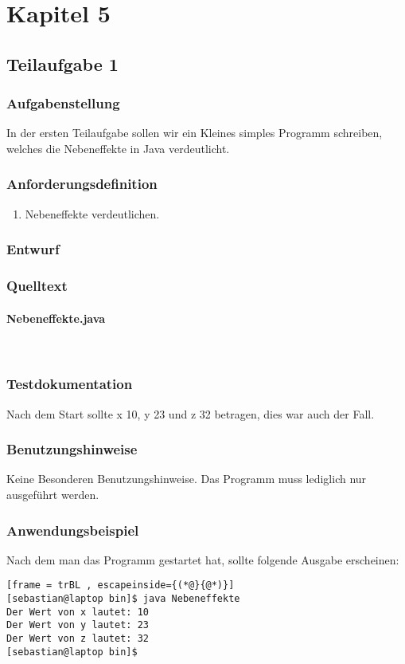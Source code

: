 \section{Kapitel 5}
\subsection{Teilaufgabe 1}
\subsubsection{Aufgabenstellung}
In der ersten Teilaufgabe sollen wir ein Kleines simples Programm schreiben,
welches die Nebeneffekte in Java verdeutlicht.

\subsubsection{Anforderungsdefinition}
\begin{enumerate}
	\item Nebeneffekte verdeutlichen.
\end{enumerate}

\subsubsection{Entwurf}


\subsubsection{Quelltext}
\paragraph{Nebeneffekte.java}\


\subsubsection{Testdokumentation}
Nach dem Start sollte x 10, y 23 und z 32 betragen, dies war auch der Fall.

\subsubsection{Benutzungshinweise}
Keine Besonderen Benutzungshinweise.
Das Programm muss lediglich nur ausgeführt werden.

\subsubsection{Anwendungsbeispiel}
Nach dem man das Programm gestartet hat, sollte folgende Ausgabe erscheinen:
\begin{lstlisting}[frame = trBL , escapeinside={(*@}{@*)}]
[sebastian@laptop bin]$ java Nebeneffekte 
Der Wert von x lautet: 10
Der Wert von y lautet: 23
Der Wert von z lautet: 32
[sebastian@laptop bin]$ 
\end{lstlisting}
